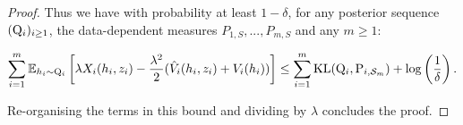 \begin{proof}
 Thus we have with probability at least $1-\delta$, for any posterior sequence $(\mathrm{Q}_{i})_{i\geq 1}$, the data-dependent measures $P_{1,S},...,P_{m,S}$ and any $m\geq 1$:

 \begin{align*}
  \sum_{i=1}^m \mathbb{E}_{h_i\sim \mathrm{Q}_{i}}\left[\lambda X_i(h_i,z_i)  - \frac{\lambda^2}{2}(\hat{V}_i(h_i,z_i) + V_i(h_i))\right] \leq \sum_{i=1}^m \operatorname{KL}(\mathrm{Q}_{i},\mathrm{P}_{i,\mathcal{S}_m}) + \log \left( \frac{1}{\delta}  \right).
 \end{align*}

 Re-organising the terms in this bound and dividing by $\lambda$ concludes the proof.

 \end{proof}

